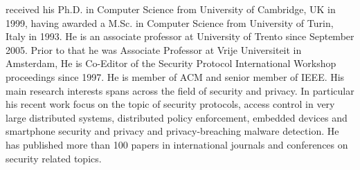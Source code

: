 \documentclass[final,5p,times,twocolumn]{elsarticle}
\begin{document}
 received his Ph.D. in Computer Science from University of Cambridge, UK in 1999, having awarded a M.Sc. in Computer Science from University of Turin, Italy in 1993. He is an associate professor at University of Trento since September 2005. Prior to that he was Associate Professor at Vrije Universiteit in  Amsterdam, He is Co-Editor of the Security Protocol  International Workshop proceedings since 1997. He is member of ACM and senior member of IEEE. His main research interests spans across the field of security and privacy. In particular his recent work focus on the topic of security protocols, access control in very large distributed systems, distributed policy enforcement, embedded devices and smartphone security and privacy and privacy-breaching malware detection. He has published more than 100 papers in international journals and conferences on security related topics. 
\end{document}

